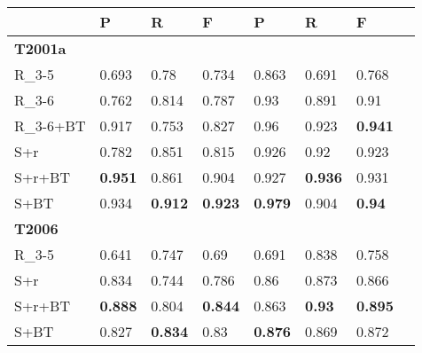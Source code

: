 \documentclass[journal]{IEEEtran}
\begin{document}
\begin{table}[h]
\small
\centering
\begin{tabular}{| l | l | l | l | l | l | l| l| }
     \hline              
   &   P   & R  &  F & P    & R      & F       \\
     \hline
\textbf{T2001a} & & & & & & \\ 
\hline
     R\_3-5  
         & 0.693  & 0.78
& 0.734  & 0.863 & 0.691
& 0.768 \\
\hline
R\_3-6                & 0.762
& 0.814  & 0.787 & 0.93
& 0.891  & 0.91 \\
\hline
R\_3-6+BT  & 0.917 & 0.753 & 0.827 & 0.96 & 0.923 & \textbf{0.941} \\
\hline
S+r & 0.782 & 0.851 & 0.815 & 0.926 & 0.92 & 0.923 \\
\hline
S+r+BT  & \textbf{0.951} & 0.861 & 0.904 & 0.927 & \textbf{0.936} & 0.931\\
\hline
S+BT  & 0.934 & \textbf{0.912} & \textbf{0.923} & \textbf{0.979} & 0.904 & \textbf{0.94}\\
\hline 

\textbf{T2006} & & & & & & \\ 
\hline
     R\_3-5    
         & 0.641  & 0.747
& 0.69  & 0.691 & 0.838
& 0.758 \\
\hline
S+r & 0.834 & 0.744 & 0.786 & 0.86 & 0.873 & 0.866 \\
\hline
S+r+BT   & \textbf{0.888} & 0.804 & \textbf{0.844} & 0.863 & \textbf{0.93} & 
\textbf{0.895}\\
\hline
S+BT  & 0.827 & \textbf{0.834} & 0.83 & \textbf{0.876} & 0.869 & 0.872\\
\hline


\end{tabular}
\end{table}
\end{document}
